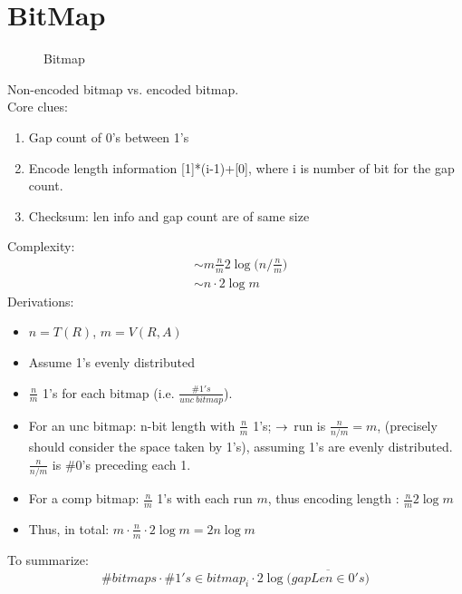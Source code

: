 \documentclass[a4paper]{report}
\begin{document}
\section{BitMap}
\begin{figure}[H]
\centering
{}
\caption{Bitmap}
\label{fig:LABEL}
\end{figure}
Non-encoded bitmap vs. encoded bitmap.
\\
Core clues:
\begin{enumerate}
\item Gap count of 0's between 1's
\item Encode length information [1]*(i-1)+[0], where i is number of bit for the gap count.
\item Checksum: len info and gap count are of same size
\end{enumerate}
Complexity:
\begin{align*}
& \sim m \frac{n}{m} 2\log\Big(n/\frac{n}{m} \Big) \\
& \sim n \cdot 2\log m
\end{align*}
Derivations:
\begin{itemize}
\item $n = T(R)$, $m = V(R, A)$
\item Assume 1's evenly distributed
\item $\frac{n}{m}$ 1's for each bitmap (i.e. $\frac{\#1's}{unc\ bitmap}$).
\item For an unc bitmap: n-bit length with $\frac{n}{m}$ 1's; $\rightarrow$ run is $\frac{n}{n/m}=m$, (precisely should consider the space taken by 1's), assuming 1's are evenly distributed. $\frac{n}{n/m}$ is \#0's preceding each 1.
\item For a comp bitmap: $\frac{n}{m}$ 1's with each run $m$, thus encoding length : $\frac{n}{m} 2 \log m$
\item Thus, in total: $m \cdot \frac{n}{m} \cdot 2 \log{m} = 2n\log m$
\end{itemize}

To summarize:
$$
\#bitmaps \cdot \#1's\in bitmap_i \cdot 2\log\Big(\overline{gapLen\in 0's}\Big)
$$
\end{document}
